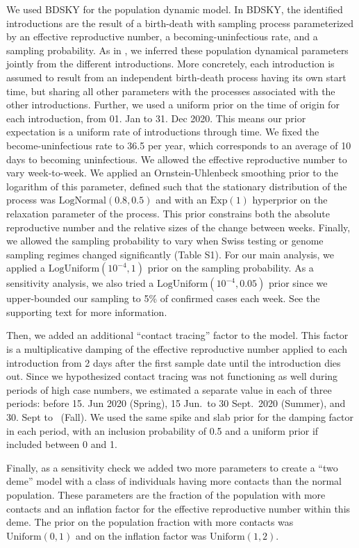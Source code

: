 \documentclass[9pt,twoside,lineno]{pnas-new} %
\begin{document}
We used BDSKY for the population dynamic model. In BDSKY, the identified introductions are the result of a birth-death with sampling process parameterized by an effective reproductive number, a becoming-uninfectious rate, and a sampling probability. As in \cite{Muller2020}, we inferred these population dynamical parameters jointly from the different introductions. More concretely, each introduction is assumed to result from an independent birth-death process having its own start time, but sharing all other parameters with the processes associated with the other introductions. 
Further, we used a uniform prior on the time of origin for each introduction, from 01. Jan to 31. Dec 2020. This means our prior expectation is a uniform rate of introductions through time. We fixed the become-uninfectious rate to 36.5 per year, which corresponds to an average of 10 days to becoming uninfectious. We allowed the effective reproductive number to vary week-to-week. We applied an Ornstein-Uhlenbeck smoothing prior to the logarithm of this parameter, defined such that the stationary distribution of the process was $\text{LogNormal}(0.8, 0.5)$  and with an $\text{Exp}(1)$ hyperprior on the relaxation parameter of the process. This prior constrains both the absolute reproductive number and the relative sizes of the change between weeks. Finally, we allowed the sampling probability to vary when Swiss testing or genome sampling regimes changed significantly (Table S1). For our main analysis, we applied a $\text{LogUniform}(10^{-4}, 1)$ prior on the sampling probability. As a sensitivity analysis, we also tried a $\text{LogUniform}(10^{-4}, 0.05)$ prior since we upper-bounded our sampling to 5\% of confirmed cases each week. See the supporting text for more information.

Then, we added an additional ``contact tracing'' factor to the model. This factor is a multiplicative damping of the effective reproductive number applied to each introduction from 2 days after the first sample date until the introduction dies out. Since we hypothesized contact tracing was not functioning as well during periods of high case numbers, we estimated a separate value in each of three periods: before 15. Jun 2020 (Spring), 15 Jun.~to 30 Sept.~2020 (Summer), and 30. Sept to \maxdate\ (Fall). We used the same spike and slab prior for the damping factor in each period, with an inclusion probability of 0.5 and a uniform prior if included between 0 and 1. 

Finally, as a sensitivity check we added two more parameters to create a ``two deme'' model with a class of individuals having more contacts than the normal population. These parameters are the fraction of the population with more contacts and an inflation factor for the effective reproductive number within this deme. The prior on the population fraction with more contacts was $\text{Uniform}(0,1)$ and on the inflation factor was $\text{Uniform}(1,2)$. 
\end{document}
